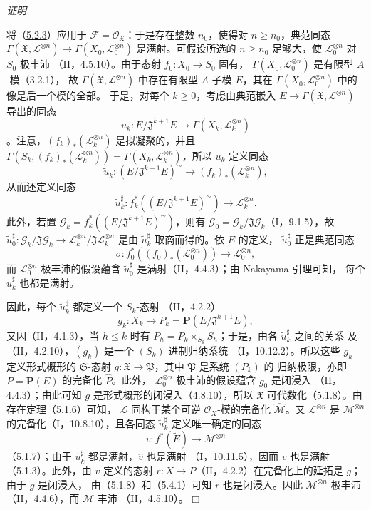 \documentclass[UTF8,fontset=none,11pt,oneside,openany]{ctexbook}
\providecommand{\square}{\mdlgwhtsquare}
\newenvironment{proof}{%
  \par\smallskip\noindent\textit{证明.}\ %
}{\hfill$\square$\par}
\begin{document}
\begin{proof}
将（\hyperref[III.5.2.3-fr]{5.2.3}）应用于
$\mathcal F=\mathcal O_{\mathfrak X}$：于是存在整数 $n_0$，使得对
$n\geq n_0$，典范同态
$\Gamma(\mathfrak X,\mathcal L^{\otimes n})\to
\Gamma(X_0,\mathcal L_0^{\otimes n})$ 是满射。可假设所选的
$n\geq n_0$ 足够大，使 $\mathcal L_0^{\otimes n}$ 对 $S_0$ 极丰沛
（II，4.5.10）。由于态射 $f_0:X_0\to S_0$ 固有，
$\Gamma(X_0,\mathcal L_0^{\otimes n})$ 是有限型 $A$-模（3.2.1），
故 $\Gamma(\mathfrak X,\mathcal L^{\otimes n})$ 中存在有限型 $A$-子模
$E$，其在 $\Gamma(X_0,\mathcal L_0^{\otimes n})$ 中的像是后一个模的全部。
于是，对每个 $k\geq0$，考虑由典范嵌入
$E\to\Gamma(\mathfrak X,\mathcal L^{\otimes n})$ 导出的同态
\[
u_k:E/\mathfrak J^{k+1}E\longrightarrow
\Gamma(X_k,\mathcal L_k^{\otimes n})
\]
。注意，$(f_k)_*(\mathcal L_k^{\otimes n})$ 是拟凝聚的，并且
$\Gamma(S_k,(f_k)_*(\mathcal L_k^{\otimes n}))
=\Gamma(X_k,\mathcal L_k^{\otimes n})$，所以 $u_k$ 定义同态
\[
\widetilde u_k:(E/\mathfrak J^{k+1}E)^\sim
\longrightarrow(f_k)_*(\mathcal L_k^{\otimes n}),
\]
从而还定义同态
\[
\widetilde u_k^\sharp:
f_k^*((E/\mathfrak J^{k+1}E)^\sim)\longrightarrow
\mathcal L_k^{\otimes n}.
\]
此外，若置 $\mathcal G_k=f_k^*((E/\mathfrak J^{k+1}E)^\sim)$，则有
$\mathcal G_0=\mathcal G_k/\mathfrak J\mathcal G_k$（I，9.1.5），故
$\widetilde u_0^\sharp:\mathcal G_k/\mathfrak J\mathcal G_k
\to\mathcal L_k^{\otimes n}/\mathfrak J\mathcal L_k^{\otimes n}$ 是由
$\widetilde u_k^\sharp$ 取商而得的。依 $E$ 的定义，
$\widetilde u_0^\sharp$ 正是典范同态
\[
\sigma:f_0^*((f_0)_*(\mathcal L_0^{\otimes n}))\longrightarrow
\mathcal L_0^{\otimes n},
\]
而 $\mathcal L_0^{\otimes n}$ 极丰沛的假设蕴含
$\widetilde u_0^\sharp$ 是满射（II，4.4.3）；由 Nakayama 引理可知，
每个 $\widetilde u_k^\sharp$ 也都是满射。

因此，每个 $\widetilde u_k^\sharp$ 都定义一个 $S_k$-态射
（II，4.2.2）
\[
g_k:X_k\longrightarrow P_k=\mathbf P(E/\mathfrak J^{k+1}E),
\]
又因（II，4.1.3），当 $h\leq k$ 时有
$P_h=P_k\times_{S_k}S_h$；于是，由各 $\widetilde u_k^\sharp$ 之间的关系
及（II，4.2.10），$(g_k)$ 是一个 $(S_k)$-进制归纳系统
（I，10.12.2）。所以这些 $g_k$ 定义形式概形的 $\mathfrak S$-态射
$g:\mathfrak X\to\mathfrak P$，其中 $\mathfrak P$ 是系统 $(P_k)$ 的
归纳极限，亦即 $P=\mathbf P(E)$ 的完备化 $\widehat P$。此外，
$\mathcal L_0^{\otimes n}$ 极丰沛的假设蕴含 $g_0$ 是闭浸入
（II，4.4.3）；由此可知 $g$ 是形式概形的闭浸入（4.8.10），所以
$\mathfrak X$ 可代数化（5.1.8）。由存在定理（5.1.6）可知，
$\mathcal L$ 同构于某个可逆 $\mathcal O_X$-模的完备化
$\widehat{\mathcal M}$。又 $\mathcal L^{\otimes n}$ 是
$\mathcal M^{\otimes n}$ 的完备化（I，10.8.10），且各同态
$\widetilde u_k^\sharp$ 定义唯一确定的同态
\[
v:f^*(\widetilde E)\longrightarrow\mathcal M^{\otimes n}
\]
（5.1.7）；由于 $\widetilde u_k^\sharp$ 都是满射，$\widehat v$ 也是满射
（I，10.11.5），因而 $v$ 也是满射（5.1.3）。此外，由 $v$ 定义的态射
$r:X\to P$（II，4.2.2）在完备化上的延拓是 $g$；由于 $g$ 是闭浸入，
由（5.1.8）和（5.4.1）可知 $r$ 也是闭浸入。因此
$\mathcal M^{\otimes n}$ 极丰沛（II，4.4.6），而 $\mathcal M$ 丰沛
（II，4.5.10）。
\end{proof}
\end{document}
